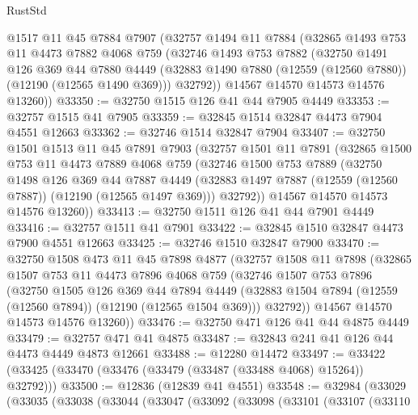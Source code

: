 \begin{lexlean}{RustStd}
\begin{coremodule}
    @1517
    @11
    @45
    @7884
    @7907
    (@32757
      @1494
      @11
      @7884
      (@32865
        @1493
        @753
        @11
        @4473
        @7882
        @4068
        @759
        (@32746
          @1493
          @753
          @7882
          (@32750
            @1491
            @126
            @369
            @44
            @7880
            @4449
            (@32883 @1490 @7880 (@12559 (@12560 @7880)) (@12190 (@12565 @1490 @369)))
            @32792))
        @14567
        @14570
        @14573
        @14576
        @13260))
@33350 := @32750 @1515 @126 @41 @44 @7905 @4449
@33353 := @32757 @1515 @41 @7905
@33359 := @32845 @1514 @32847 @4473 @7904 @4551 @12663
@33362 := @32746 @1514 @32847 @7904
@33407 := @32750
    @1501
    @1513
    @11
    @45
    @7891
    @7903
    (@32757
      @1501
      @11
      @7891
      (@32865
        @1500
        @753
        @11
        @4473
        @7889
        @4068
        @759
        (@32746
          @1500
          @753
          @7889
          (@32750
            @1498
            @126
            @369
            @44
            @7887
            @4449
            (@32883 @1497 @7887 (@12559 (@12560 @7887)) (@12190 (@12565 @1497 @369)))
            @32792))
        @14567
        @14570
        @14573
        @14576
        @13260))
@33413 := @32750 @1511 @126 @41 @44 @7901 @4449
@33416 := @32757 @1511 @41 @7901
@33422 := @32845 @1510 @32847 @4473 @7900 @4551 @12663
@33425 := @32746 @1510 @32847 @7900
@33470 := @32750
    @1508
    @473
    @11
    @45
    @7898
    @4877
    (@32757
      @1508
      @11
      @7898
      (@32865
        @1507
        @753
        @11
        @4473
        @7896
        @4068
        @759
        (@32746
          @1507
          @753
          @7896
          (@32750
            @1505
            @126
            @369
            @44
            @7894
            @4449
            (@32883 @1504 @7894 (@12559 (@12560 @7894)) (@12190 (@12565 @1504 @369)))
            @32792))
        @14567
        @14570
        @14573
        @14576
        @13260))
@33476 := @32750 @471 @126 @41 @44 @4875 @4449
@33479 := @32757 @471 @41 @4875
@33487 := @32843 @241 @41 @126 @44 @4473 @4449 @4873 @12661
@33488 := @12280 @14472
@33497 := @33422 (@33425 (@33470 (@33476 (@33479 (@33487 (@33488 @4068) @15264)) @32792)))
@33500 := @12836 (@12839 @41 @4551)
@33548 := @32984
    (@33029
      (@33035
        (@33038
          (@33044
            (@33047
              (@33092
                (@33098
                  (@33101
                    (@33107
                      (@33110

\end{coremodule}
\end{lexlean}

